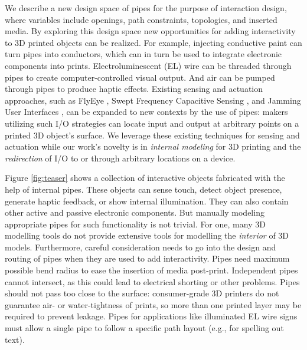 We describe a new design space of pipes for the purpose of interaction design, where variables include openings, path constraints, topologies, and inserted media. By exploring this design space new opportunities for adding interactivity to 3D printed objects can be realized. For example, injecting conductive paint can turn pipes into conductors, which can in turn be used to integrate electronic components into prints. Electroluminescent (EL) wire can be threaded through pipes to create computer-controlled visual output. And air can be pumped through pipes to produce haptic effects.  Existing sensing and actuation approaches, such as FlyEye \cite{Wimmer-flyeye}, Swept Frequency Capacitive Sensing \cite{Sato-touche}, and Jamming User Interfaces \cite{Follmer-jamming}, can be expanded to new contexts by the use of pipes: makers utilizing such I/O strategies can locate input and output at arbitrary points on a printed 3D object's surface.  We leverage these existing techniques for sensing and actuation while our work's novelty is in \emph{internal modeling} for 3D printing and the \emph{redirection} of I/O to or through arbitrary locations on a device.


Figure \ref{fig:teaser} shows a collection of interactive objects fabricated with the help of internal pipes. These objects can sense touch, detect object presence, generate haptic feedback, or show internal illumination. They can also contain other active and passive electronic components. But manually modeling appropriate pipes for such functionality is not trivial.  For one, many 3D modelling tools do not provide extensive tools for modelling the  {\em interior} of 3D models. Furthermore, careful consideration needs to go into the design and routing of pipes when they are used to add interactivity. Pipes need maximum possible bend radius to ease the insertion of media post-print.  Independent pipes cannot intersect, as this could lead to electrical shorting or other problems.  Pipes should not pass too close to the surface: consumer-grade 3D printers do not guarantee air- or water-tightness of prints, so more than one printed layer may be required to prevent leakage.  Pipes for applications like illuminated EL wire signs must allow a single pipe to follow a specific path layout (e.g., for spelling out text). 

